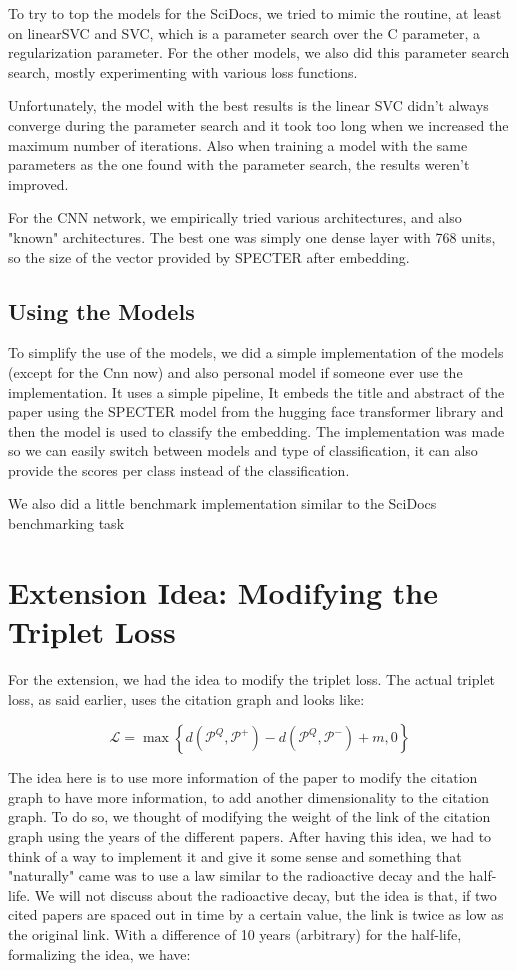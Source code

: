 \documentclass[conference]{IEEEtran}
\begin{document}
To try to top the models for the SciDocs, we tried to mimic the routine, at least on linearSVC and SVC, which is a parameter search over the C parameter, a regularization parameter. For the other models, we also did this parameter search search, mostly experimenting with various loss functions.

Unfortunately, the model with the best results is the linear SVC didn't always converge during the parameter search and it took too long when we increased the maximum number of iterations. Also when training a model with the same parameters as the one found with the parameter search, the results weren't improved.

For the CNN network, we empirically tried various architectures, and also "known" architectures. The best one was simply one dense layer with 768 units, so the size of the vector provided by SPECTER after embedding.

\subsection{Using the Models}

To simplify the use of the models, we did a simple implementation of the models (except for the Cnn now) and also personal model if someone ever use the implementation. It uses a simple pipeline, It embeds the title and abstract of the paper using the SPECTER model from the hugging face transformer library and then the model is used to classify the embedding. The implementation was made so we can easily switch between models and type of classification, it can also provide the scores per class instead of the classification.

We also did a little benchmark implementation similar to the SciDocs benchmarking task

\section{Extension Idea: Modifying the Triplet Loss}

For the extension, we had the idea to modify the triplet loss. The actual triplet loss, as said earlier, uses the citation graph and looks like:

$$\mathcal L = \max\left\{d\left(\mathcal P^Q, \mathcal P^+\right) - d\left(\mathcal P^Q, \mathcal P^-\right) + m, 0\right\}$$

The idea here is to use more information of the paper to modify the citation graph to have more information, to add another dimensionality to the citation graph. To do so, we thought of modifying the weight of the link of the citation graph using the years of the different papers. After having this idea, we had to think of a way to implement it and give it some sense and something that "naturally" came was to use a law similar to the radioactive decay and the half-life. We will not discuss about the radioactive decay, but the idea is that, if two cited papers are spaced out in time by a certain value, the link is twice as low as the original link. With a difference of 10 years (arbitrary) for the half-life, formalizing the idea, we have:
\end{document}
